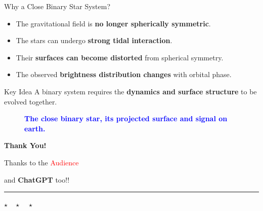 \documentclass{beamer}
\begin{document}
    \begin{frame}{Why a Close Binary Star System?}
    	
    	\begin{itemize}
    		\item The gravitational field is \textbf{no longer spherically symmetric}.    		
    		\item The stars can undergo \textbf{strong tidal interaction}.    		
    		\item Their \textbf{surfaces can become distorted} from spherical symmetry.    		
    		\item The observed \textbf{brightness distribution changes} with orbital phase.
    	\end{itemize}
    	
    	\begin{block}{Key Idea}
    		\centering
    		A binary system requires the \textbf{dynamics and surface structure} to be evolved together.
    	\end{block}
       	
    \end{frame}

    \begin{frame}
    	\centering
    	\begin{figure}
    		\caption*{\textbf{\textcolor{blue}{The close binary star, its projected surface and signal on earth.}}}
    	\end{figure}
    \end{frame}

	\begin{frame}		
		\begin{center}			
			\vspace{1.5cm}
			
			{\fontsize{34}{40}\selectfont
				\textcolor{blue!80!black}{\textbf{Thank You!}}
			}
			
			\vspace{0.5cm}
			
			{\fontsize{24}{30}\selectfont
				\textcolor{gray!70!black}{Thanks to the \textcolor{red}{Audience}}
			}
			
			\vspace{0.25cm}
			
			{\fontsize{22}{28}\selectfont
				and \textcolor{teal!70!black}{\textbf{ChatGPT}} too!!}
			
			\vspace{0.7cm}
			
			\textcolor{orange!80!black}{\rule{7cm}{1.5pt}}
			
			\vspace{0.8cm}
			
			{\Large
				\textcolor{blue!70!black}{$\star\quad\star\quad\star$}
			}
			
		\end{center}		
	\end{frame}	
\end{document}
